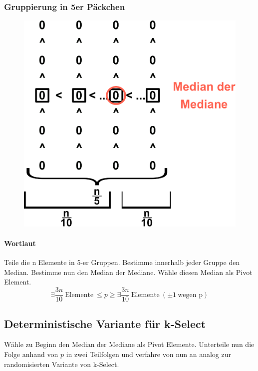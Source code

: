 \subsubsection*{Gruppierung in 5er Päckchen}
\begin{figure}
\vspace{-40pt}
\includegraphics[width=\linewidth]{8/Grafik/img1.png}
\caption{}
\end{figure}

\vspace{30pt}
\paragraph{Wortlaut}
Teile die n Elemente in 5-er Gruppen. Bestimme innerhalb jeder Gruppe den Median. Bestimme nun den Median der Mediane. Wähle diesen Median als Pivot Element.
\[\exists \frac{3n}{10}~\text{Elemente}~\leq p \geq \exists \frac{3n}{10}~\text{Elemente}~(\pm 1~\text{wegen p})\]
\vspace{50pt}


\newpage


\subsection{Deterministische Variante für k-Select}
Wähle zu Beginn den Median der Mediane als Pivot Elemente. Unterteile nun die Folge anhand von $p$ in zwei Teilfolgen und verfahre von nun an analog zur randomisierten Variante von k-Select.

